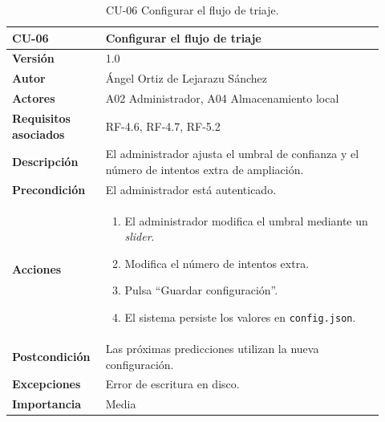 \begin{table}[H]
	\centering
	\begin{tabular}{ p{0.21\linewidth} p{0.71\linewidth} }
		\toprule
		\textbf{CU-06}    & \textbf{Configurar el flujo de triaje}\\
		\toprule
		\textbf{Versión}              & 1.0 \\
		\textbf{Autor}                & Ángel Ortiz de Lejarazu Sánchez \\
		\textbf{Actores}              & A02 Administrador, A04 Almacenamiento local \\
		\textbf{Requisitos asociados} & RF-4.6, RF-4.7, RF-5.2 \\
		\textbf{Descripción}          & El administrador ajusta el umbral de confianza y el número de intentos extra de ampliación. \\
		\textbf{Precondición}         & El administrador está autenticado. \\
		\textbf{Acciones}             &
		\begin{enumerate}
			\def\labelenumi{\arabic{enumi}.}
			\item El administrador modifica el umbral mediante un \textit{slider}.
			\item Modifica el número de intentos extra.
			\item Pulsa ``Guardar configuración''.
			\item El sistema persiste los valores en \texttt{config.json}.
		\end{enumerate} \\
		\textbf{Postcondición}        & Las próximas predicciones utilizan la nueva configuración. \\
		\textbf{Excepciones}          & Error de escritura en disco. \\
		\textbf{Importancia}          & Media \\
		\bottomrule
	\end{tabular}
	\caption{CU-06 Configurar el flujo de triaje.}
\end{table}

